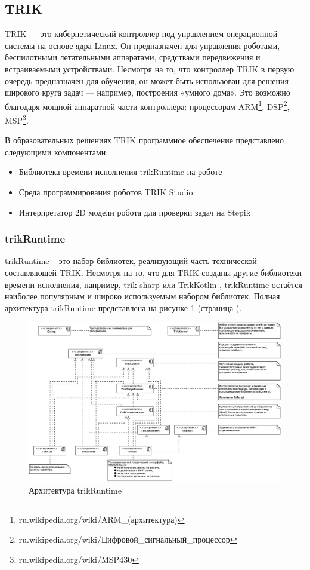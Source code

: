 \documentclass[14pt]{matmex-diploma-custom}
\begin{document}
\subsection{TRIK}
TRIK — это кибернетический контроллер под управлением операционной системы на основе ядра Linux. Он предназначен для управления роботами, беспилотными летательными аппаратами, средствами передвижения и встраиваемыми устройствами. Несмотря на то, что контроллер TRIK в первую очередь предназначен для обучения, он может быть использован для решения широкого круга задач — например, построения «умного дома». Это возможно благодаря мощной аппаратной части контроллера: процессорам ARM\footnote{ru.wikipedia.org/wiki/ARM\_(архитектура)}, DSP\footnote{ru.wikipedia.org/wiki/Цифровой\_сигнальный\_процессор}, MSP\footnote{ru.wikipedia.org/wiki/MSP430}.

В образовательных решениях TRIK программное обеспечение представлено следующими компонентами:
\begin{itemize}
    \item Библиотека времени исполнения trikRuntime на роботе
    \item Среда программирования роботов TRIK Studio
    \item Интерпретатор 2D модели робота для проверки задач на Stepik
\end{itemize}

\subsubsection{trikRuntime}
trikRuntime -- это набор библиотек, реализующий часть технической составляющей TRIK. Несмотря на то, что для TRIK созданы другие библиотеки времени исполнения, например, trik-sharp \cite{KirsanovSECR, KirsanovDiploma} или TrikKotlin \cite{BelkovYearlyProject}, trikRuntime остаётся наиболее популярным и широко используемым набором библиотек. Полная архитектура trikRuntime представлена на рисунке \ref{trikRuntime} (страница \pageref{trikRuntime}).

\begin{figure}[h]
	\includegraphics[width=\textwidth]{images/trikRuntime.jpg}
	\caption{Архитектура trikRuntime}
	\label{trikRuntime}
\end{figure}
\end{document}
